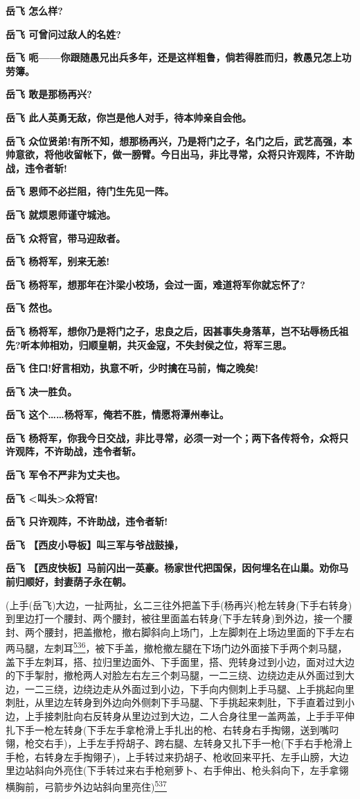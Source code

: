\textbf{岳飞 怎么样?}

\textbf{岳飞 可曾问过敌人的名姓?}

\textbf{岳飞
呃------你跟随愚兄出兵多年，还是这样粗鲁，倘若得胜而归，教愚兄怎上功劳簿。}

\textbf{岳飞 敢是那杨再兴?}

\textbf{岳飞 此人英勇无敌，你岂是他人对手，待本帅亲自会他。}

\textbf{岳飞
众位贤弟!有所不知，想那杨再兴，乃是将门之子，名门之后，武艺高强，本帅意欲，将他收留帐下，做一膀臂。今日出马，非比寻常，众将只许观阵，不许助战，违令者斩!}

\textbf{岳飞 恩师不必拦阻，待门生先见一阵。}

\textbf{岳飞 就烦恩师谨守城池。}

\textbf{岳飞 众将官，带马迎敌者。}

\textbf{岳飞 杨将军，别来无恙!}

\textbf{岳飞 杨将军，想那年在汴梁小校场，会过一面，难道将军你就忘怀了?}

\textbf{岳飞 然也。}

\textbf{岳飞
杨将军，想你乃是将门之子，忠良之后，因甚事失身落草，岂不玷辱杨氏祖先?听本帅相劝，归顺皇朝，共灭金寇，不失封侯之位，将军三思。}

\textbf{岳飞 住口!好言相劝，执意不听，少时擒在马前，悔之晚矣!}

\textbf{岳飞 决一胜负。}

\textbf{岳飞 这个\ldots{}\ldots{}杨将军，俺若不胜，情愿将潭州奉让。}

\textbf{岳飞
杨将军，你我今日交战，非比寻常，必须一对一个；两下各传将令，众将只许观阵，不许助战，违令者斩。}

\textbf{岳飞 军令不严非为丈夫也。}

\textbf{岳飞 \textless{}叫头\textgreater{}众将官!}

\textbf{岳飞 只许观阵，不许助战，违令者斩!}

\textbf{岳飞 【西皮小导板】叫三军与爷战鼓操，}

\textbf{岳飞
【西皮快板】马前闪出一英豪。杨家世代把国保，因何埋名在山巢。劝你马前归顺好，封妻荫子永在朝。}

(上手(岳飞)大边，一扯两扯，幺二三往外把盖下手(杨再兴)枪左转身(下手右转身)到里边打一个腰封、两个腰封，被往里面盖右转身(下手左转身)到外边，接一个腰封、两个腰封，把盖撤枪，撤右脚斜向上场门，上左脚刺在上场边里面的下手左右两马腿，左刺耳\protect\hyperlink{fn536}{\textsuperscript{536}}，被下手盖，撤枪撤左腿在下场门边外面接下手两个刺马腿，盖下手左刺耳，搭、拉归里边面外、下手面里，搭、兜转身过到小边，面对过大边的下手掣肘，撤枪两人对脸左右左三个刺马腿，一二三绕、边绕边走从外面过到大边，一二三绕，边绕边走从外面过到小边，下手向内侧刺上手马腿、上手挑起向里刺肚，从里边左转身到外边向外侧刺下手马腿、下手挑起来刺肚，下手直着过到小边，上手接刺肚向右反转身从里边过到大边，二人合身往里一盖两盖，上手手平伸扎下手一枪左转身(下手左手拿枪滑上手扎出的枪、右转身右手掏翎，送到嘴叼翎，枪交右手)，上手左手捋胡子、跨右腿、左转身又扎下手一枪(下手右手枪滑上手枪，右转身左手掏翎子)，上手转过来扔胡子、枪收回来平托、左手山膀，大边里边站斜向外亮住(下手转过来右手枪剜萝卜、右手伸出、枪头斜向下，左手拿翎横胸前，弓箭步外边站斜向里亮住)\protect\hyperlink{fn537}{\textsuperscript{537}}

